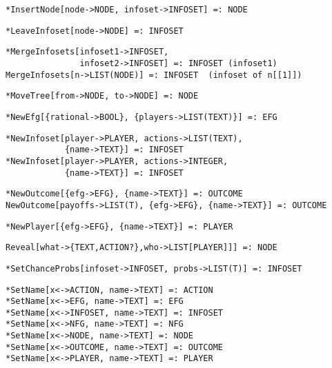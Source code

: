\protect \large \begin{verbatim}
*InsertNode[node->NODE, infoset->INFOSET] =: NODE
\end{verbatim}\normalsize

\protect \large \begin{verbatim}
*LeaveInfoset[node->NODE] =: INFOSET
\end{verbatim}\normalsize


\protect \large \begin{verbatim}
*MergeInfosets[infoset1->INFOSET,
               infoset2->INFOSET] =: INFOSET (infoset1)
MergeInfosets[n->LIST(NODE)] =: INFOSET  (infoset of n[[1]])
\end{verbatim}\normalsize


\protect \large \begin{verbatim}
*MoveTree[from->NODE, to->NODE] =: NODE
\end{verbatim}\normalsize

\protect \large \begin{verbatim} 
*NewEfg[{rational->BOOL}, {players->LIST(TEXT)}] =: EFG
\end{verbatim}\normalsize


\protect \large \begin{verbatim} 
*NewInfoset[player->PLAYER, actions->LIST(TEXT),
            {name->TEXT}] =: INFOSET
*NewInfoset[player->PLAYER, actions->INTEGER,
            {name->TEXT}] =: INFOSET
\end{verbatim}\normalsize

\protect \large \begin{verbatim} 
*NewOutcome[{efg->EFG}, {name->TEXT}] =: OUTCOME
NewOutcome[payoffs->LIST(T), {efg->EFG}, {name->TEXT}] =: OUTCOME
\end{verbatim}\normalsize

\protect \large \begin{verbatim}
*NewPlayer[{efg->EFG}, {name->TEXT}] =: PLAYER 
\end{verbatim}\normalsize

\protect \large \begin{verbatim}
Reveal[what->{TEXT,ACTION?},who->LIST[PLAYER]]] =: NODE     
\end{verbatim}\normalsize

\protect \large \begin{verbatim} 
*SetChanceProbs[infoset->INFOSET, probs->LIST(T)] =: INFOSET
\end{verbatim}\normalsize

\protect \large \begin{verbatim}
*SetName[x<->ACTION, name->TEXT] =: ACTION
*SetName[x<->EFG, name->TEXT] =: EFG
*SetName[x<->INFOSET, name->TEXT] =: INFOSET
*SetName[x<->NFG, name->TEXT] =: NFG
*SetName[x<->NODE, name->TEXT] =: NODE
*SetName[x<->OUTCOME, name->TEXT] =: OUTCOME
*SetName[x<->PLAYER, name->TEXT] =: PLAYER
\end{verbatim}\normalsize

